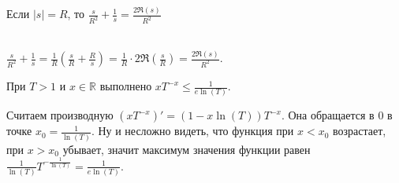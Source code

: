 \begin{lemma} \label{l5_lm14}
	Если $|s| = R$, то $\displaystyle \frac{s}{R^2} + \frac{1}{s} = \frac{2 \Re(s)}{R^2}$
\end{lemma}
\begin{pf}~\\
    $\displaystyle \frac{s}{R^2} + \frac{1}{s} = \frac{1}{R} \left( \frac{s}{R} + \frac{R}{s} \right) = \frac{1}{R} \cdot 2 \Re\left(\frac{s}{R}\right) = \frac{2 \Re(s)}{R^2}$.
\end{pf}

\begin{lemma} \label{l5_lm15}
    При $T > 1$ и $x \in \mathbb{R}$ выполнено $\displaystyle x T^{-x} \leq \frac{1}{e \ln(T)}$.
\end{lemma}
\begin{pf}
	Считаем производную $\displaystyle (x T^{-x})' = (1 - x \ln(T))T^{-x}$.  Она обращается в $0$ в точке $\displaystyle x_0 = \frac{1}{\ln(T)}$. Ну и несложно видеть, что функция при $x < x_0$ возрастает, при $x > x_0$ убывает, значит максимум значения функции равен $\displaystyle \frac{1}{\ln (T)} T^{-\frac{1}{\ln(T)}} = \frac{1}{e \ln(T)}$.
\end{pf}

